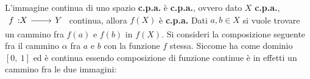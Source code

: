 \begin{observe}
	L'immagine continua di uno spazio \textbf{c.p.a.} è \textbf{c.p.a.}, ovvero dato $X$ \textbf{c.p.a.}, $\funz f X Y$ continua, allora $f(X)$ è \textbf{c.p.a.}\newline
	Dati $a,b\in X$ si vuole trovare un cammino fra $f(a)$ e $f(b)$ in $f(X)$. Si consideri la composizione seguente fra il cammino $\alpha$ fra $a$ e $b$ con la funzione $f$ stessa. Siccome ha come dominio $\left[0,\ 1\right]$ ed è continua essendo composizione di funzione continue è in effetti un cammino fra le due immagini:
\begin{center}
\end{center}
\vspace{-6mm}
\end{observe}
